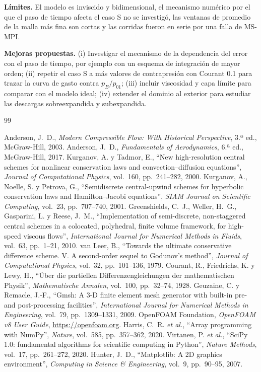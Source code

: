 \documentclass[12pt,letterpaper]{article}
\numberwithin{equation}{section}
\begin{document}
\textbf{Límites.} El modelo es inviscido y bidimensional, el mecanismo numérico por el que el paso de tiempo afecta el caso S no se investigó, las ventanas de promedio de la malla más fina son cortas y las corridas fueron en serie por una falla de MS-MPI.

\textbf{Mejoras propuestas.} (i) Investigar el mecanismo de la dependencia del error con el paso de tiempo, por ejemplo con un esquema de integración de mayor orden; (ii) repetir el caso S a más valores de contrapresión con Courant 0.1 para trazar la curva de gasto contra $p_B/p_{01}$; (iii) incluir viscosidad y capa límite para comparar con el modelo ideal; (iv) extender el dominio al exterior para estudiar las descargas sobreexpandida y subexpandida.

\newpage
\begin{thebibliography}{99}
 Anderson, J.~D., \textit{Modern Compressible Flow: With Historical Perspective}, 3.ª ed., McGraw-Hill, 2003.
 Anderson, J.~D., \textit{Fundamentals of Aerodynamics}, 6.ª ed., McGraw-Hill, 2017.
 Kurganov, A. y Tadmor, E., ``New high-resolution central schemes for nonlinear conservation laws and convection--diffusion equations'', \textit{Journal of Computational Physics}, vol.~160, pp.~241--282, 2000.
 Kurganov, A., Noelle, S. y Petrova, G., ``Semidiscrete central-upwind schemes for hyperbolic conservation laws and Hamilton--Jacobi equations'', \textit{SIAM Journal on Scientific Computing}, vol.~23, pp.~707--740, 2001.
 Greenshields, C.~J., Weller, H.~G., Gasparini, L. y Reese, J.~M., ``Implementation of semi-discrete, non-staggered central schemes in a colocated, polyhedral, finite volume framework, for high-speed viscous flows'', \textit{International Journal for Numerical Methods in Fluids}, vol.~63, pp.~1--21, 2010.
 van Leer, B., ``Towards the ultimate conservative difference scheme. V. A second-order sequel to Godunov's method'', \textit{Journal of Computational Physics}, vol.~32, pp.~101--136, 1979.
 Courant, R., Friedrichs, K. y Lewy, H., ``Über die partiellen Differenzengleichungen der mathematischen Physik'', \textit{Mathematische Annalen}, vol.~100, pp.~32--74, 1928.
 Geuzaine, C. y Remacle, J.-F., ``Gmsh: A 3-D finite element mesh generator with built-in pre- and post-processing facilities'', \textit{International Journal for Numerical Methods in Engineering}, vol.~79, pp.~1309--1331, 2009.
 OpenFOAM Foundation, \textit{OpenFOAM v8 User Guide}, \url{https://openfoam.org}.
 Harris, C.~R. \textit{et al.}, ``Array programming with NumPy'', \textit{Nature}, vol.~585, pp.~357--362, 2020.
 Virtanen, P. \textit{et al.}, ``SciPy 1.0: fundamental algorithms for scientific computing in Python'', \textit{Nature Methods}, vol.~17, pp.~261--272, 2020.
 Hunter, J.~D., ``Matplotlib: A 2D graphics environment'', \textit{Computing in Science \& Engineering}, vol.~9, pp.~90--95, 2007.
\end{thebibliography}
\end{document}
